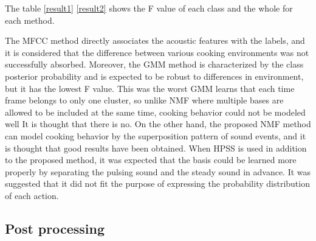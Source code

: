 \documentclass[sigconf,anonymous]{acmart}
\begin{document}
\begin{table}[t]
  \centering
  \caption{NMF results}
  \label{result2}
\end{table}

The table \ref{result1} \ref{result2} shows the F value of each class and the whole for each method.

The MFCC method directly associates the acoustic features with the labels, and it is considered that the difference between various cooking environments was not successfully absorbed.
Moreover, the GMM method is characterized by the class posterior probability and is expected to be robust to differences in environment, but it has the lowest F value. This was the worst%
GMM learns that each time frame belongs to only one cluster, so unlike NMF where multiple bases are allowed to be included at the same time, cooking behavior could not be modeled well It is thought that there is no.
On the other hand, the proposed NMF method can model cooking behavior by the superposition pattern of sound events, and it is thought that good results have been obtained.
When HPSS is used in addition to the proposed method, it was expected that the basis could be learned more properly by separating the pulsing sound and the steady sound in advance. It was suggested that it did not fit the purpose of expressing the probability distribution of each action.



\subsection{Post processing}
\end{document}
